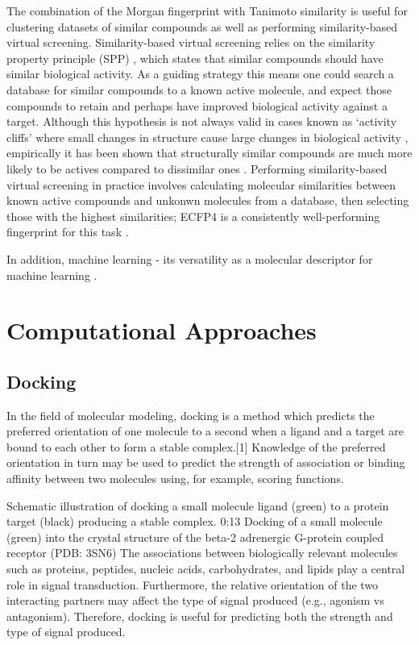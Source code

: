 The combination of the Morgan fingerprint with Tanimoto similarity is useful for clustering \cite{Butina1999Clustering} datasets of similar compounds as well as performing similarity-based virtual screening. Similarity-based virtual screening relies on the  similarity property principle (SPP) \cite{johnson1990concepts}, which states that similar compounds should have similar biological activity. As a guiding strategy this means one could search a database for similar compounds to a known active molecule, and expect those compounds to retain and perhaps have improved biological activity against a target. Although this hypothesis is not always valid in cases known as `activity cliffs' where small changes in structure cause large changes in biological activity \cite{maggiora2006cliffs}, empirically it has been shown that structurally similar compounds are much more likely to be actives compared to dissimilar ones \cite{martin2002similar}. Performing similarity-based virtual screening in practice involves calculating molecular similarities between known active compounds and unkonwn molecules from a database, then selecting those with the highest similarities; ECFP4 is a consistently well-performing fingerprint for this task \cite{riniker2013benchmark, oboyle2016benchmark}.

In addition, machine learning - its versatility as a molecular descriptor for machine learning \cite{wu2017molnet, Bender2019}.

\section{Computational Approaches}

\subsection{Docking}

In the field of molecular modeling, docking is a method which predicts the preferred orientation of one molecule to a second when a ligand and a target are bound to each other to form a stable complex.[1] Knowledge of the preferred orientation in turn may be used to predict the strength of association or binding affinity between two molecules using, for example, scoring functions.

Schematic illustration of docking a small molecule ligand (green) to a protein target (black) producing a stable complex.
0:13
Docking of a small molecule (green) into the crystal structure of the beta-2 adrenergic G-protein coupled receptor (PDB: 3SN6)
The associations between biologically relevant molecules such as proteins, peptides, nucleic acids, carbohydrates, and lipids play a central role in signal transduction. Furthermore, the relative orientation of the two interacting partners may affect the type of signal produced (e.g., agonism vs antagonism). Therefore, docking is useful for predicting both the strength and type of signal produced.


